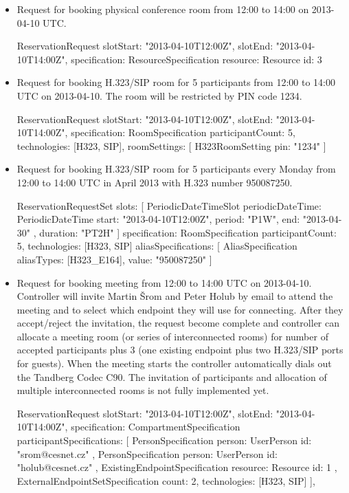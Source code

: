 \begin{itemize}

\item Request for booking physical conference room from 12:00 to 14:00 on 2013-04-10 UTC.
\begin{Entity}
ReservationRequest {
  slotStart: "2013-04-10T12:00Z",
  slotEnd:   "2013-04-10T14:00Z",
  specification: ResourceSpecification {
    resource: Resource { id: 3 }
  }
}
\end{Entity}

\item Request for booking H.323/SIP room for 5 participants from 12:00 to 14:00 UTC on 2013-04-10. The room will be restricted by PIN code 1234.
\begin{Entity}
ReservationRequest {
  slotStart: "2013-04-10T12:00Z",
  slotEnd:   "2013-04-10T14:00Z",
  specification: RoomSpecification {
    participantCount: 5,
    technologies: [H323, SIP],
    roomSettings: [
      H323RoomSetting { pin: "1234" }
    ]
  }
}
\end{Entity}

\newpage
\item Request for booking H.323/SIP room for 5 participants every Monday from 12:00 to 14:00 UTC in April 2013 with H.323 number 950087250.
\begin{Entity}
ReservationRequestSet {
  slots: [
    PeriodicDateTimeSlot {
      periodicDateTime: PeriodicDateTime {
        start:  "2013-04-10T12:00Z",
        period: "P1W",
        end:    "2013-04-30"
      },
      duration: "PT2H"
    }
  ]
  specification: RoomSpecification {
    participantCount: 5,
    technologies: [H323, SIP]
    aliasSpecifications: [
      AliasSpecification { aliasTypes: [H323_E164], value: "950087250" }
    ]
  }
}
\end{Entity}

\item Request for booking meeting from 12:00 to 14:00 UTC on 2013-04-10. Controller will invite Martin Šrom and Peter Holub by email to attend the meeting and to select which endpoint they will use for connecting. After they accept/reject the invitation, the request become complete and controller can allocate a meeting room (or series of interconnected rooms) for number of accepted participants plus 3 (one existing endpoint plus two H.323/SIP ports for guests). When the meeting starts the controller automatically dials out the Tandberg Codec C90. The invitation of participants and allocation of multiple interconnected rooms is not fully implemented yet.
\begin{Entity}
ReservationRequest {
  slotStart: "2013-04-10T12:00Z",
  slotEnd:   "2013-04-10T14:00Z",
  specification: CompartmentSpecification {
    participantSpecifications: [
      PersonSpecification {
        person: UserPerson { id: "srom@cesnet.cz"}
      },
      PersonSpecification {
        person: UserPerson { id: "holub@cesnet.cz"}
      },      
      ExistingEndpointSpecification { 
        resource: Resource { id: 1 } 
      },
      ExternalEndpointSetSpecification {
        count: 2,
        technologies: [H323, SIP]
      }
    ],    
  }
}
\end{Entity}


\end{itemize}
